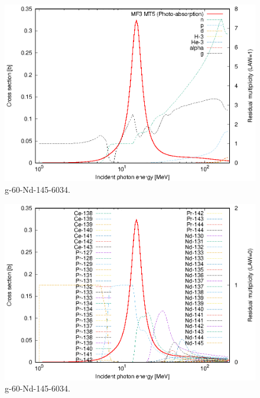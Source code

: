\begin{figure}
 \includegraphics[width=\linewidth]{eps/g_60-Nd-145_6034.eps}
  \caption{g-60-Nd-145-6034.}
\end{figure}
\begin{figure}
 \includegraphics[width=\linewidth]{eps-law0/g_60-Nd-145_6034.eps}
 \caption{g-60-Nd-145-6034.}
\end{figure}
\newpage \clearpage

